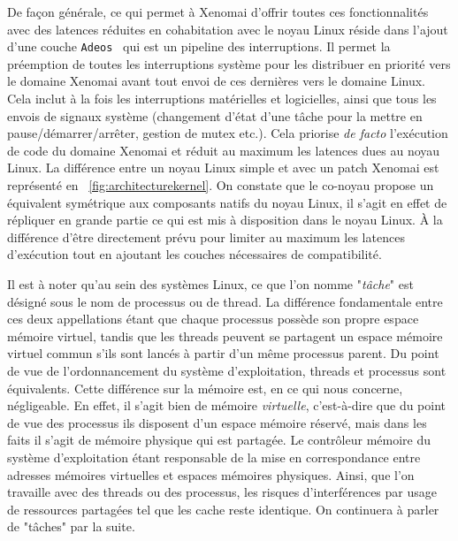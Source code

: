 \documentclass[french, a4paper, 11pt, twoside, pdftex]{StyleThese}
\begin{document}
    	De façon générale, ce qui permet à Xenomai d'offrir toutes ces fonctionnalités avec des latences réduites en cohabitation avec le noyau Linux réside dans l'ajout d'une couche \texttt{Adeos}~\cite{gerum_life_2005} qui est un pipeline des  interruptions. Il permet la préemption de toutes les interruptions système pour les distribuer en priorité vers le domaine Xenomai avant tout envoi de ces dernières vers le domaine Linux. Cela inclut à la fois les interruptions matérielles et logicielles, ainsi que tous les envois de signaux système (changement d'état d'une tâche pour la mettre en pause/démarrer/arrêter, gestion de mutex etc.). Cela priorise \textit{de facto} l'exécution de code du domaine Xenomai et réduit au maximum les latences dues au noyau Linux. La différence entre un noyau Linux simple et avec un patch Xenomai est représenté en ~\autoref{fig:architecturekernel}. On constate que le co-noyau propose un équivalent symétrique aux composants natifs du noyau Linux, il s'agit en effet de répliquer en grande partie ce qui est mis à disposition dans le noyau Linux. À la différence d'être directement prévu pour limiter au maximum les latences d'exécution tout en ajoutant les couches nécessaires de compatibilité.

  	
		Il est à noter qu'au sein des systèmes Linux, ce que l'on nomme "\textit{tâche}" est désigné sous le nom de processus ou de thread. La différence fondamentale entre ces deux appellations étant que chaque processus possède son propre espace mémoire virtuel, tandis que les threads peuvent se partagent un espace mémoire virtuel commun s'ils sont lancés à partir d'un même processus parent. Du point de vue de l'ordonnancement du système d'exploitation, threads et processus sont équivalents. Cette différence sur la mémoire est, en ce qui nous concerne, négligeable. En effet, il s'agit bien de mémoire \textit{virtuelle}, c'est-à-dire que du point de vue des processus ils disposent d'un espace mémoire réservé, mais dans les faits il s'agit de mémoire physique qui est partagée. Le contrôleur mémoire du système d'exploitation étant responsable de la mise en correspondance entre adresses mémoires virtuelles et espaces mémoires physiques. Ainsi, que l'on travaille avec des threads ou des processus, les risques d'interférences par usage de ressources partagées tel que les cache reste identique. On continuera à parler de "tâches" par la suite.
	
\end{document}
